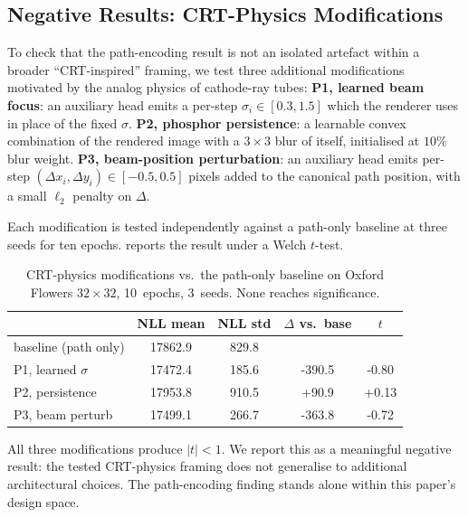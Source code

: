\documentclass[conference,a4paper]{IEEEtran}
\begin{document}
\subsection{Negative Results: CRT-Physics Modifications}\label{ssec:cnn}

To check that the path-encoding result is not an isolated
artefact within a broader ``CRT-inspired'' framing, we test three
additional modifications motivated by the analog physics of
cathode-ray tubes:
\textbf{P1, learned beam focus}: an auxiliary head emits a
per-step $\sigma_i \in [0.3, 1.5]$ which the renderer uses in place
of the fixed $\sigma$.
\textbf{P2, phosphor persistence}: a learnable convex combination
of the rendered image with a $3\times3$ blur of itself, initialised
at $10\%$ blur weight.
\textbf{P3, beam-position perturbation}: an auxiliary head emits
per-step $(\Delta x_i, \Delta y_i) \in [-0.5, 0.5]$ pixels added to
the canonical path position, with a small $\ell_2$ penalty on
$\Delta$.

Each modification is tested independently against a path-only
baseline at three seeds for ten epochs. 
reports the result under a Welch $t$-test.

\begin{table}[t]
\centering
\caption{CRT-physics modifications vs.\ the path-only baseline on
Oxford Flowers $32\times32$, 10~epochs, 3~seeds. None reaches
significance.}
\label{tab:postulates}
\begin{tabular}{l S[table-format=5.1] S[table-format=4.1]
                  S[table-format=+4.1] S[table-format=+1.2]}
\toprule
& {NLL mean} & {NLL std} & {$\Delta$ vs.\ base} & {$t$} \\
\midrule
baseline (path only) & 17862.9 & 829.8 &      &  \\
\midrule
P1, learned $\sigma$ & 17472.4 & 185.6 & -390.5 & -0.80 \\
P2, persistence      & 17953.8 & 910.5 &  +90.9 & +0.13 \\
P3, beam perturb     & 17499.1 & 266.7 & -363.8 & -0.72 \\
\bottomrule
\end{tabular}
\end{table}

All three modifications produce $|t|<1$. We report this as a
meaningful negative result: the tested CRT-physics framing does not
generalise to additional architectural choices. The path-encoding
finding stands alone within this paper's design space.

\end{document}
